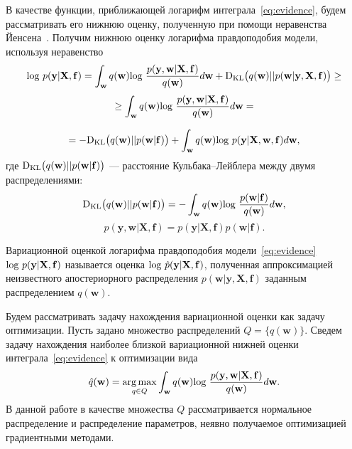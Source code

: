 

{В качестве функции, приближающей логарифм интеграла~\eqref{eq:evidence}, будем рассматривать его нижнюю оценку, полученную при помощи неравенства Йенсена~\cite{Bishop}. Получим нижнюю оценку логарифма правдоподобия модели, используя неравенство}
\begin{equation} 
\label{eq:elbo}
\textnormal{log}~p(\mathbf{y}|\mathbf{X},\mathbf{f})  = \int_{\mathbf{w}} q(\mathbf{w})\textnormal{log}~\frac{p(\mathbf{y},\mathbf{w}|\mathbf{X},\mathbf{f})}{q(\mathbf{w})}d\mathbf{w} + \textnormal{D}_\textnormal{KL}  \bigl(q(\mathbf{w})||p(\mathbf{w}|\mathbf{y}, \mathbf{X}, \mathbf{f})\bigr) \geq	
\end{equation} 
$$
\geq \int_{\mathbf{w}} q(\mathbf{w})\textnormal{log}~\frac{p(\mathbf{y},\mathbf{w}|\mathbf{X},\mathbf{f})}{q(\mathbf{w})}d\mathbf{w} =
$$

$$
= -\textnormal{D}_\textnormal{KL} \bigl(q(\mathbf{w})||p(\mathbf{w}|\mathbf{f})\bigr) + \int_{\mathbf{w}} q(\mathbf{w})\textnormal{log}~{p(\mathbf{y}|\mathbf{X},\mathbf{w},\mathbf{f})} d \mathbf{w},
$$
где $\textnormal{D}_\textnormal{KL}\bigl(q(\mathbf{w})||p(\mathbf{w} |\mathbf{f})\bigr)$ --- расстояние Кульбака--Лейблера между двумя распределениями: $$\textnormal{D}_\textnormal{KL}\bigl(q(\mathbf{w})||p(\mathbf{w} |\mathbf{f})\bigr) = -\int_{\mathbf{w}} q(\mathbf{w})\textnormal{log}~\frac{p(\mathbf{w} | \mathbf{f})}{q(\mathbf{w})}d\mathbf{w},$$
$$
p(\mathbf{y},\mathbf{w}|\mathbf{X},\mathbf{f}) = p(\mathbf{y}|\mathbf{X},\mathbf{f})p(\mathbf{w}|\mathbf{f}).
$$

{
Вариационной оценкой логарифма правдоподобия модели~\eqref{eq:evidence} $\textnormal{log}~p(\mathbf{y}|\mathbf{X},\mathbf{f})$ называется оценка $\textnormal{log}~\hat{p}(\mathbf{y}|\mathbf{X},\mathbf{f})$, полученная аппроксимацией неизвестного апостериорного распределения $p(\mathbf{w}| \mathbf{y}, \mathbf{X}, \mathbf{f})$ заданным распределением $q(\mathbf{w})$.

}


Будем рассматривать задачу нахождения вариационной оценки как задачу оптимизации. Пусть задано множество распределений $Q =\{q(\mathbf{w})\}$. Сведем задачу нахождения наиболее близкой вариационной нижней оценки интеграла~\eqref{eq:evidence} к оптимизации вида
\[
     \hat{q}(\mathbf{w}) = \operatorname*{arg\,max}_{q \in Q}  \int_{\mathbf{w}} q(\mathbf{w})\textnormal{log}~\frac{p(\mathbf{y},\mathbf{w}|\mathbf{X},\mathbf{f})}{q(\mathbf{w})}d\mathbf{w}.
\]  
В данной работе в качестве множества $Q$ рассматривается нормальное распределение и распределение параметров, неявно получаемое оптимизацией градиентными методами. 


